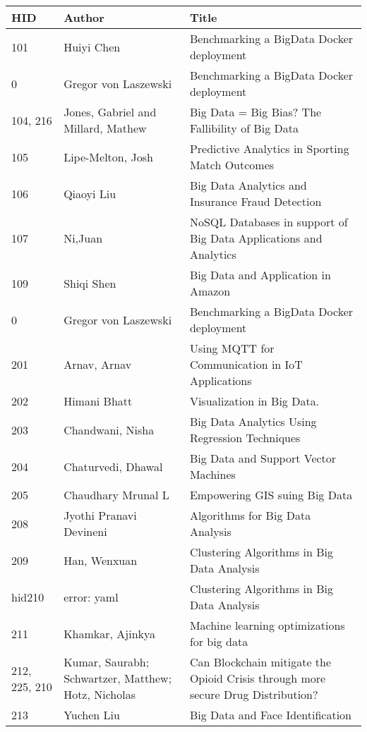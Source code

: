 \documentclass[12pt]{book}
\begin{document}
\begin{footnotesize}
\begin{longtable}{|p{1cm}p{5cm}p{9cm}|}
\hline \textbf{HID} & \textbf{Author} & \textbf{Title} \\ \hline \hline

101 & Huiyi Chen & Benchmarking a BigData Docker deployment  \\
\hline
0 & Gregor von Laszewski & Benchmarking a BigData Docker deployment  \\
\hline
104, 216 & Jones, Gabriel and Millard, Mathew & Big Data = Big Bias? The Fallibility of Big Data  \\
\hline
105 & Lipe-Melton, Josh & Predictive Analytics in Sporting Match Outcomes  \\
\hline
106 & Qiaoyi Liu & Big Data Analytics and Insurance Fraud Detection  \\
\hline
107 & Ni,Juan & NoSQL Databases in support of Big Data Applications and Analytics  \\
\hline
109 & Shiqi Shen & Big Data and Application in Amazon  \\
\hline
0 & Gregor von Laszewski & Benchmarking a BigData Docker deployment  \\
\hline
201 & Arnav, Arnav & Using MQTT for Communication in IoT Applications  \\
\hline
202 & Himani Bhatt & Visualization in Big Data.  \\
\hline
203 & Chandwani, Nisha & Big Data Analytics Using Regression Techniques  \\
\hline
204 & Chaturvedi, Dhawal & Big Data and Support Vector Machines  \\
\hline
205 & Chaudhary Mrunal L & Empowering GIS suing Big Data  \\
\hline
208 & Jyothi Pranavi Devineni & Algorithms for Big Data Analysis  \\
\hline
209 & Han, Wenxuan & Clustering Algorithms in Big Data Analysis  \\
\hline
hid210 & error: yaml & Clustering Algorithms in Big Data Analysis  \\
\hline
211 & Khamkar, Ajinkya & Machine learning optimizations for big data  \\
\hline
212, 225, 210 & Kumar, Saurabh; Schwartzer, Matthew; Hotz, Nicholas & Can Blockchain mitigate the Opioid Crisis through more secure Drug Distribution?  \\
\hline
213 & Yuchen Liu & Big Data and Face Identification  \\

\end{longtable}
\end{footnotesize}
\end{document}
